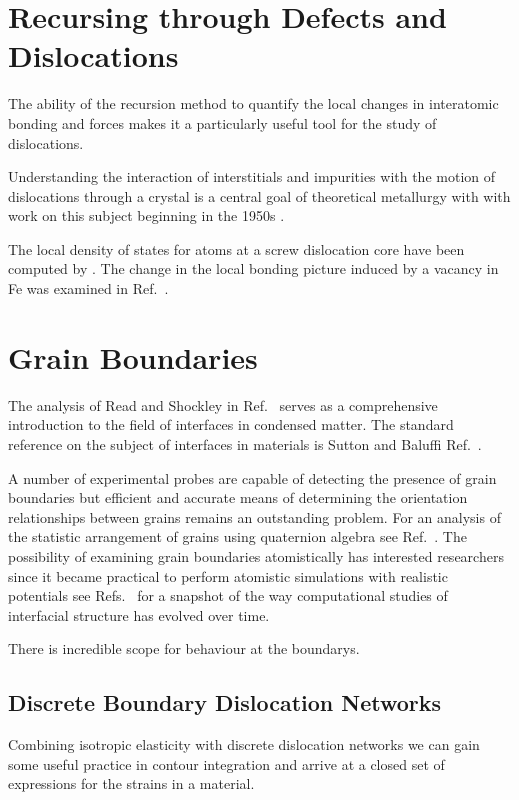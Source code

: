 \section{Recursing through Defects and Dislocations}
The ability of the recursion method to quantify the local changes in interatomic bonding and
forces makes it a particularly useful tool for the study of dislocations. 

Understanding the interaction of interstitials and impurities with the motion of
dislocations through a crystal is a central goal of theoretical metallurgy with
with work on this subject beginning in the 1950s \cite{cochardt55}.

The local density of states for atoms at a screw dislocation core have been computed by \cite{paidar81,masuda81}. 
The change in the local bonding picture induced by a vacancy in Fe was examined in Ref.~\cite{masuda82,ohta87}.

\section{Grain Boundaries}
The analysis of Read and Shockley in Ref.~\cite{read50} serves as a comprehensive
introduction to the field of interfaces in condensed matter. The 
standard reference on the subject of interfaces in materials is Sutton and 
Baluffi Ref.~\cite{sutton95}.

A number of experimental probes are capable of detecting the presence of 
grain boundaries but efficient and accurate means of determining 
the orientation relationships between grains remains an outstanding problem.
For an analysis of the statistic arrangement of grains using quaternion
algebra see Ref.~\cite{sutton96}.
The possibility of examining grain boundaries atomistically has interested
researchers since it became practical to perform atomistic simulations
with realistic potentials see Refs.~\cite{bristowe75,wolf83,paxton87,paxton88,paxtonsutton88,
kohyama88,kohyama94,paxton96,rittner96,tschopp07,momida13,du11,du12,mceniry18} for a
snapshot of the way computational studies of interfacial structure 
has evolved over time.

There is incredible scope for behaviour at the boundarys.

\subsection{Discrete Boundary Dislocation Networks}
Combining isotropic elasticity with discrete dislocation networks
we can gain some useful practice in contour integration and arrive
at a closed set of expressions for the strains in a material. 

